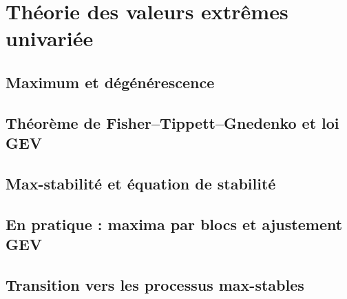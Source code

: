 \section{Théorie des valeurs extrêmes univariée}
\subsection{Maximum et dégénérescence}
\subsection{Théorème de Fisher--Tippett--Gnedenko et loi GEV}
\subsection{Max-stabilité et équation de stabilité}
\subsection{En pratique : maxima par blocs et ajustement GEV}
\subsection{Transition vers les processus max-stables}
